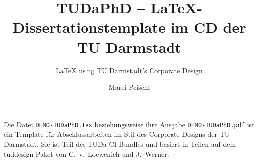 \documentclass[
	ngerman,
	ruledheaders=chapter,%
	class=book,%
	thesis={
		type=dr,
		dr=rernat
	},
	accentcolor=9c,%
	custommargins=true,%
	marginpar=false,%
	fontsize=11pt,%
]{tudapub}
\let\file\texttt
\begin{document}


\frontmatter

\title{TUDaPhD -- \LaTeX-Dissertationstemplate im CD der TU Darmstadt}
\subtitle{\LaTeX{} using TU Darmstadt's Corporate Design}
\author[M. Peischl]{Marei Peischl}%
\publishers{Darmstadt}%




\submissiondate{\today}
\examdate{\today}


\dedication{For \TeX{} \& Friends}

\maketitle

\affidavit

Die Datei \file{DEMO-TUDaPhD.tex} beziehungsweise ihre Ausgabe \file{DEMO-TUDaPhD.pdf} ist ein Template für Abschlussarbeiten im Stil des Corporate Designs der TU Darmstadt.
Sie ist Teil des TUDa-CI-Bundles und basiert in Teilen auf dem tuddesign-Paket von C.~v.~Loewenich und J.~Werner.
\end{document}
